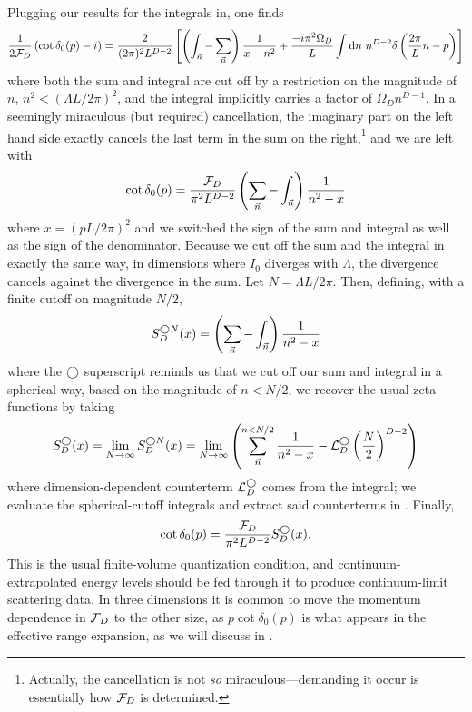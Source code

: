 Plugging our results for the integrals in, one finds
\begin{equation}
    \frac{1}{2\mathcal{F}_D}\left(\cot \delta_0(p) - i\right) = \frac{2}{(2\pi)^2 L^{D-2}}\left[ \left(\int_{\vec{n}} - \sum_{\vec{n}}\right) \frac{1}{x-n^2} + \frac{-i \pi^2\Omega_D}{L} \int \mathrm{d}n\ n^{D-2} \delta\left(\frac{2\pi}{L}n - p\right) \right]
\end{equation}
where both the sum and integral are cut off by a restriction on the magnitude of $n$, $n^2 < (\Lambda L / 2\pi)^2$, and the integral implicitly carries a factor of $\Omega_D n^{D-1}$.
In a seemingly miraculous (but required) cancellation, the imaginary part on the left hand side exactly cancels the last term in the sum on the right,\footnote{Actually, the cancellation is not \emph{so} miraculous---demanding it occur is essentially how $\mathcal{F}_D$ is determined.} and we are left with
\begin{equation}
    \cot \delta_0(p) = \frac{\mathcal{F}_D}{\pi^2 L^{D-2}} \left(\sum_{\vec{n}}-\int_{\vec{n}}\right) \frac{1}{n^2-x}
\end{equation}
where $x=(pL/2\pi)^2$ and we switched the sign of the sum and integral as well as the sign of the denominator.
Because we cut off the sum and the integral in exactly the same way, in dimensions where $I_0$ diverges with $\Lambda$, the divergence cancels against the divergence in the sum.
Let $N=\Lambda L/2\pi$.
Then, defining, with a finite cutoff on magnitude $N/2$,
\begin{equation}\label{eq:spherical cutoff S}
    S^{\bigcirc N}_D(x) = \left(\sum_{\vec{n}}- \int_{\vec{n}}\right) \frac{1}{n^2-x}
\end{equation}
where the $\bigcirc$ superscript reminds us that we cut off our sum and integral in a spherical way, based on the magnitude of $n<N/2$, we recover the usual \Luscher zeta functions by taking
\begin{equation}\label{eq:spherical S}
    S^\bigcirc_D(x)
    =
    \lim_{N\rightarrow\infty} S^{\bigcirc N}_D(x)
    =
    \lim_{N\rightarrow\infty}\left( \sum_{\vec{n}}^{n < N/2} \frac{1}{n^2-x} - \mathcal{L}_D^\bigcirc \left(\frac{N}{2}\right)^{D-2}\right)
\end{equation}
where dimension-dependent counterterm $\mathcal{L}_D^\bigcirc$ comes from the integral; we evaluate the spherical-cutoff integrals and extract said counterterms in .
Finally,
\begin{equation}\label{eq:spherical quantization}
    \cot \delta_0(p) = \frac{\mathcal{F}_D}{\pi^2 L^{D-2}} S^\bigcirc_D(x).
\end{equation}
This is the usual \Luscher finite-volume quantization condition, and continuum-extrapolated energy levels should be fed through it to produce continuum-limit scattering data.
In three dimensions it is common to move the momentum dependence in $\mathcal{F}_D$ to the other size, as $p \cot\delta_0(p)$ is what appears in the effective range expansion, as we will discuss in .

